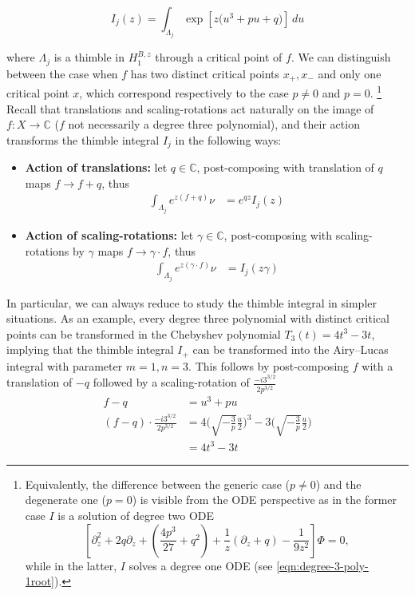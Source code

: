 \documentclass{article}
\theoremstyle{definition}
\newcommand{\C}{\mathbb{C}}
\theoremstyle{plain}
\begin{document}
\[ I_j(z) = \int_{\Lambda_j} \exp\left[z\big(u^3 + pu + q)\right]\,du \]

where $\Lambda_j$ is a thimble in $H_{1}^{B,z}$ through a critical point of $f$. We can distinguish between the case when $f$ has two distinct critical points $x_+, x_-$ and only one critical point $x$, which correspond respectively to the case $p\neq 0$ and $p=0$. \footnote{Equivalently, the difference between the generic case ($p\neq 0$) and the degenerate one ($p=0$) is visible from the ODE perspective as in the former case $I$ is a solution of degree two ODE \[\left[\partial_z^2 +2q \partial_z+\left(\frac{4p^3}{27}+q^2\right)+\frac{1}{z}\left(\partial_z +q \right)-\frac{1}{9z^2}\right]\Phi=0,\] while in the latter, $I$ solves a degree one ODE (see \eqref{eqn:degree-3-poly-1root}).}
Recall that translations and scaling-rotations act naturally on the image of $f\colon X\to \C$ ($f$ not necessarily a degree three polynomial), and their action transforms the thimble integral $I_j$ in the following ways:
\begin{itemize}
    \item \textbf{Action of translations:} let $q\in\C$, post-composing with translation of $q$ maps $f\to f+q$, thus 
    \begin{align*}
        \int_{\Lambda_j}e^{z (f+q)} \nu &= e^{qz} I_j(z)
    \end{align*}
    \item  \textbf{Action of scaling-rotations:} let $\gamma\in\C$, post-composing with scaling-rotations by $\gamma$ maps $f\to \gamma\cdot f$, thus 
    \begin{align*}
        \int_{\Lambda_j}e^{z (\gamma\cdot f)} \nu &= I_j(z \gamma)
    \end{align*}
\end{itemize}
In particular, we can always reduce to study the thimble integral in simpler situations. 
As an example, every degree three polynomial with distinct critical points can be transformed in the Chebyshev polynomial $T_3(t)=4 t^3-3t$, implying that the thimble integral $I_+$ can be transformed into the Airy--Lucas integral with parameter $m=1, n=3$. This follows by post-composing $f$ with a translation of $-q$ followed by a scaling-rotation of $\frac{ -i 3^{3/2}}{2 p^{3/2}}$
\begin{align*}
    f-q &= u^3 + pu \\
    (f-q) \cdot \frac{ -i 3^{3/2}}{2 p^{3/2}} &= 4 \Big(\sqrt{-\tfrac{3}{p}} \tfrac{u}{2} \Big)^{3} - 3\Big(\sqrt{-\tfrac{3}{p}} \tfrac{u}{2} \Big) \\
    &= 4 t^3- 3t 
\end{align*}
\end{document}

